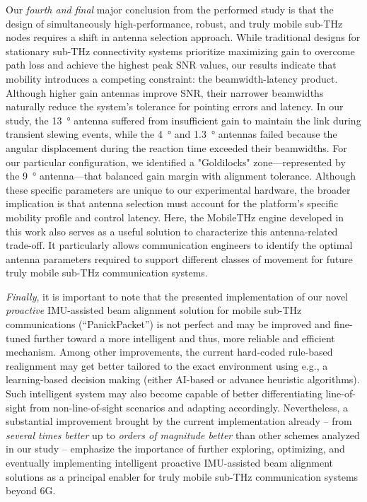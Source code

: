 \documentclass[fleqn,10pt]{wlscirep}
\begin{document}
Our \emph{fourth and final} major conclusion from the performed study is that the design of simultaneously high-performance, robust, and truly mobile sub-THz nodes requires a shift in antenna selection approach. While traditional designs for stationary sub-THz connectivity systems prioritize maximizing gain to overcome path loss and achieve the highest peak SNR values, our results indicate that mobility introduces a competing constraint: the beamwidth-latency product. Although higher gain antennas improve SNR, their narrower beamwidths naturally reduce the system's tolerance for pointing errors and latency. In our study, the \SI{13}{\degree} antenna suffered from insufficient gain to maintain the link during transient slewing events, while the \SI{4}{\degree} and \SI{1.3}{\degree} antennas failed because the angular displacement during the reaction time exceeded their beamwidths. For our particular configuration, we identified a "Goldilocks" zone—represented by the \SI{9}{\degree} antenna—that balanced gain margin with alignment tolerance. Although these specific parameters are unique to our experimental hardware, the broader implication is that antenna selection must account for the platform's specific mobility profile and control latency. Here, the MobileTHz engine developed in this work also serves as a useful solution to characterize this antenna-related trade-off. It particularly allows communication engineers to identify the optimal antenna parameters required to support different classes of movement for future truly mobile sub-THz communication systems.

\emph{Finally}, it is important to note that the presented implementation of our novel \emph{proactive} IMU-assisted beam alignment solution for mobile sub-THz communications (``PanickPacket'') is not perfect and may be improved and fine-tuned further toward a more intelligent and thus, more reliable and efficient mechanism. Among other improvements, the current hard-coded rule-based realignment may get better tailored to the exact environment using e.g., a learning-based decision making (either AI-based or advance heuristic algorithms). Such intelligent system may also become capable of better differentiating line-of-sight from non-line-of-sight scenarios and adapting accordingly. Nevertheless, a substantial improvement brought by the current implementation already -- from \emph{several times better} up to \emph{orders of magnitude better} than other schemes analyzed in our study -- emphasize the importance of further exploring, optimizing, and eventually implementing intelligent proactive IMU-assisted beam alignment solutions as a principal enabler for truly mobile sub-THz communication systems beyond 6G.
\end{document}
